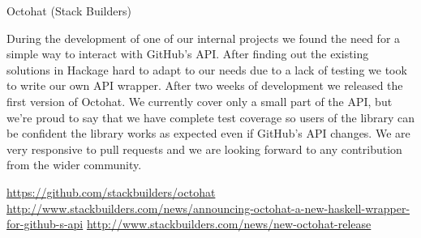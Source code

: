 \documentclass[DIV16,twocolumn,10pt]{scrreprt}
\begin{document}
\begin{hcarentry}{Octohat (Stack Builders)}
\makeheader

During the development of one of our internal projects we found the
need for a simple way to interact with GitHub's API. After finding out
the existing solutions in Hackage hard to adapt to our needs due to a
lack of testing we took to write our own API wrapper. After two weeks
of development we released the first version of Octohat. We currently
cover only a small part of the API, but we're proud to say that we
have complete test coverage so users of the library can be confident
the library works as expected even if GitHub's API changes. We are
very responsive to pull requests and we are looking forward to any
contribution from the wider community.

\FurtherReading
\url{https://github.com/stackbuilders/octohat} \url{http://www.stackbuilders.com/news/announcing-octohat-a-new-haskell-wrapper-for-github-s-api} \url{http://www.stackbuilders.com/news/new-octohat-release}
\end{hcarentry}
\end{document}
